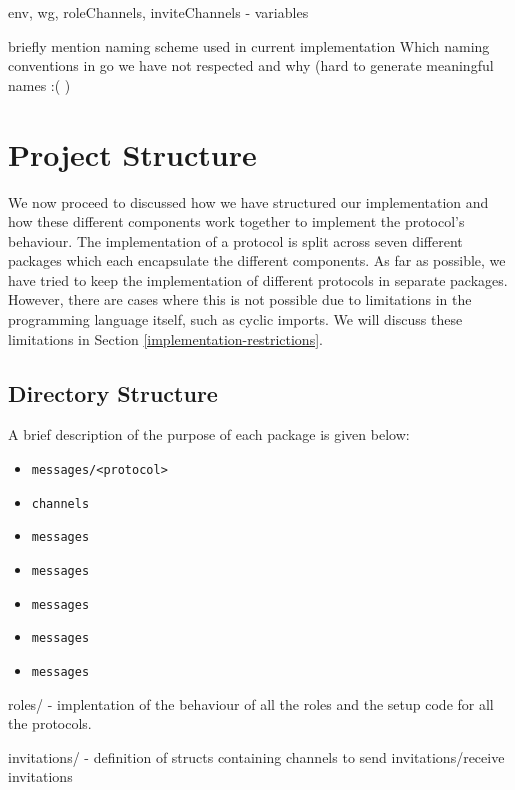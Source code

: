 \documentclass[12pt,twoside]{report}
\begin{document}
env, wg, roleChannels, inviteChannels - variables


briefly mention naming scheme used in current implementation
Which naming conventions in go we have not respected and why (hard to generate meaningful names :(  )


\section{Project Structure}\label{project-structure}

We now proceed to discussed how we have structured our implementation and how these different components work together to implement the protocol's behaviour. The implementation of a protocol is split across seven different packages which each encapsulate the different components. As far as possible, we have tried to keep the implementation of different protocols in separate packages. However, there are cases where this is not possible due to limitations in the programming language itself, such as cyclic imports. We will discuss these limitations in Section \ref{implementation-restrictions}.



\subsection{Directory Structure}\label{directory-structure}



A brief description of the purpose of each package is given below:
\begin{itemize}
    \item \texttt{messages/<protocol>}
    \item \texttt{channels}
    \item \texttt{messages}
    \item \texttt{messages}
    \item \texttt{messages}
    \item \texttt{messages}
    \item \texttt{messages}
\end{itemize}

roles/ - implentation of the behaviour of all the roles and the setup code for all the protocols.

invitations/ - definition of structs containing channels to send 
invitations/receive invitations
\end{document}
